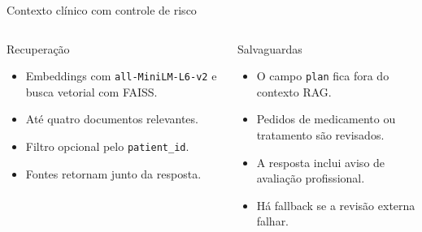 \documentclass[aspectratio=169,11pt]{beamer}
\begin{document}
\begin{frame}{Contexto clínico com controle de risco}
  \begin{columns}[T,onlytextwidth]
    \begin{block}{Recuperação}
      \begin{itemize}
        \item Embeddings com \texttt{all-MiniLM-L6-v2} e busca vetorial com FAISS.
        \item Até quatro documentos relevantes.
        \item Filtro opcional pelo \texttt{patient\_id}.
        \item Fontes retornam junto da resposta.
      \end{itemize}
    \end{block}
    \begin{alertblock}{Salvaguardas}
      \begin{itemize}
        \item O campo \texttt{plan} fica fora do contexto RAG.
        \item Pedidos de medicamento ou tratamento são revisados.
        \item A resposta inclui aviso de avaliação profissional.
        \item Há fallback se a revisão externa falhar.
      \end{itemize}
    \end{alertblock}
  \end{columns}
\end{frame}
\end{document}

